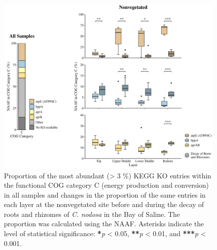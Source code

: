 \documentclass[
  12 pt,
]{article}
\begin{document}
\begin{figure}[H]

{\centering \includegraphics[width=1\linewidth]{../results/figures/cog_c_kegg} 

}

\caption{Proportion of the most abundant (\textgreater{} 3 \si{\percent}) KEGG KO entries within the functional COG category C (energy production and conversion) in all samples and changes in the proportion of the same entries in each layer at the nonvegetated site before and during the decay of roots and rhizomes of \emph{C. nodosa} in the Bay of Saline. The proportion was calculated using the NAAF. Asterisks indicate the level of statistical significance: \textbf{*}\emph{p} \textless{} 0.05, \textbf{**}\emph{p} \textless{} 0.01, and \textbf{***}\emph{p} \textless{} 0.001.}\label{fig:cog-c-kegg}
\end{figure}
\end{document}
